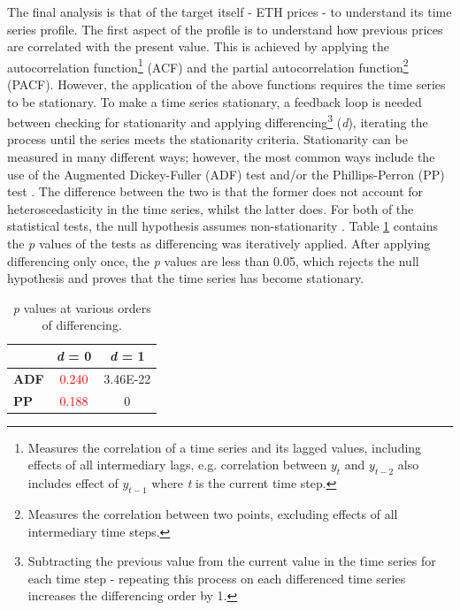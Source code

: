 \documentclass[ %
                    author={Raj Dhakan},
                supervisor={Dr. Ayush Joshi},
                    degree={MSc},
                     title={Ethereum Price Prediction using Internal and External Factors},
                  subtitle={},
                      type={},
                      year={2025}]{dissertation}
\begin{document}
The final analysis is that of the target itself - ETH prices - to understand its time series profile. The first aspect of the profile is to understand how previous prices are correlated with the present value. This is achieved by applying the autocorrelation function\footnote{Measures the correlation of a time series and its lagged values, including effects of all intermediary lags, e.g. correlation between $y_t$ and $y_{t-2}$ also includes effect of $y_{t-1}$ where \textit{t} is the current time step.} (ACF) and the partial autocorrelation function\footnote{Measures the correlation between two points, excluding effects of all intermediary time steps.} (PACF). However, the application of the above functions requires the time series to be stationary. To make a time series stationary, a feedback loop is needed between checking for stationarity and applying differencing\footnote{Subtracting the previous value from the current value in the time series for each time step - repeating this process on each differenced time series increases the differencing order by 1.} (\textit{d}), iterating the process until the series meets the stationarity criteria. Stationarity can be measured in many different ways; however, the most common ways include the use of the Augmented Dickey-Fuller (ADF) test and/or the Phillips-Perron (PP) test \cite{petricua2017stationarity}. The difference between the two is that the former does not account for heteroscedasticity in the time series, whilst the latter does. For both of the statistical tests, the null hypothesis assumes non-stationarity \cite{petricua2017stationarity}. Table \ref{tab:stationarity_check_matrix} contains the \textit{p} values of the tests as differencing was iteratively applied. After applying differencing only once, the \textit{p} values are less than 0.05, which rejects the null hypothesis and proves that the time series has become stationary. 

\begin{table}[ht]
\centering
\caption{\textit{p} values at various orders of differencing.}
\label{tab:stationarity_check_matrix}
\begin{tabular}{lcc}
\toprule
\multicolumn{1}{c}{} & \textbf{\textit{d} = 0} & \textbf{\textit{d} = 1} \\
\midrule
\textbf{ADF} & \textcolor{red}{\num{0.240}} & \textcolor{green!50!black}{\num{3.46E-22}} \\
\textbf{PP} & \textcolor{red}{\num{0.188}} & \textcolor{green!50!black}{0} \\
\bottomrule
\end{tabular}
\end{table}
\end{document}
